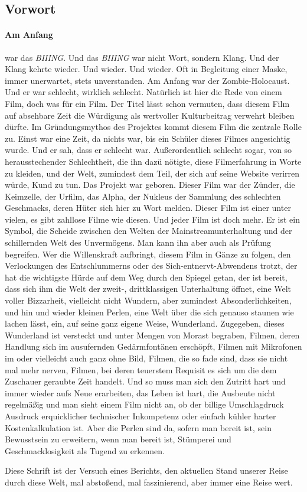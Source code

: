 \subsection{Vorwort}

\paragraph{Am Anfang} war das \emph{BIIING}.
Und das \emph{BIIING} war nicht Wort, sondern Klang.
Und der Klang kehrte wieder. Und wieder. Und wieder.
Oft in Begleitung einer Maske, immer unerwartet, stets unverstanden.
Am Anfang war der Zombie-Holocaust.
Und er war schlecht, wirklich schlecht. 
Natürlich ist hier die Rede von einem Film, doch was für ein Film.
Der Titel lässt schon vermuten, dass diesem Film auf absehbare Zeit die Würdigung als wertvoller Kulturbeitrag verwehrt bleiben dürfte.
Im Gründungsmythos des Projektes kommt diesem Film die zentrale Rolle zu.
Einst war eine Zeit, da nichts war, bis ein Schüler dieses Filmes angesichtig wurde.
Und er sah, dass er schlecht war. Außerordentlich schlecht sogar, von so herausstechender Schlechtheit, die ihn dazü nötigte, diese Filmerfahrung in Worte zu kleiden, und der Welt, zumindest dem Teil, der sich auf seine Website verirren würde, Kund zu tun.
Das Projekt war geboren.
Dieser Film war der Zünder, die Keimzelle, der Urfilm, das Alpha, der Nukleus der Sammlung des schlechten Geschmacks, deren Hüter sich hier zu Wort melden.
Dieser Film ist einer unter vielen, 
es gibt zahllose Filme wie diesen.
Und jeder Film ist doch mehr.
Er ist ein Symbol, die Scheide zwischen den Welten der Mainstreamunterhaltung und der schillernden Welt des Unvermögens.
Man kann ihn aber auch als Prüfung begreifen.
Wer die Willenskraft aufbringt, diesem Film in Gänze zu folgen, den Verlockungen des Entschlummerns oder des Sich-entnervt-Abwendens trotzt, der hat die wichtigste Hürde auf dem Weg durch den Spiegel getan, der ist bereit, dass sich ihm die Welt der zweit-, drittklassigen Unterhaltung öffnet, eine Welt voller Bizzarheit, vielleicht nicht Wundern, aber zumindest Absonderlichkeiten, und hin und wieder kleinen Perlen, eine Welt über die sich genauso staunen wie lachen lässt, ein, auf seine ganz eigene Weise, Wunderland.
Zugegeben, dieses Wunderland ist versteckt und unter Mengen von Morast begraben, Filmen, deren Handlung sich im ausufernden Gedärmfontänen erschöpft, Filmen mit Mikrofonen im oder vielleicht auch ganz ohne Bild, Filmen, die so fade sind, dass sie nicht mal mehr nerven, Filmen, bei deren teuerstem Requisit es sich um die dem Zuschauer geraubte Zeit handelt.
Und so muss man sich den Zutritt hart und immer wieder aufs Neue erarbeiten, das Leben ist hart, die Ausbeute nicht regelmäßig und man sieht einem Film nicht an, ob der billige Umschlagdruck Ausdruck erquicklicher technischer Inkompetenz oder einfach kühler harter Kostenkalkulation ist.
Aber die Perlen sind da, sofern man bereit ist, sein Bewusstsein zu erweitern, wenn man bereit ist, Stümperei und Geschmacklosigkeit als Tugend zu erkennen.

Diese Schrift ist der Versuch eines Berichts, den aktuellen Stand unserer Reise durch diese Welt, mal abstoßend, mal faszinierend, aber immer eine Reise wert.

